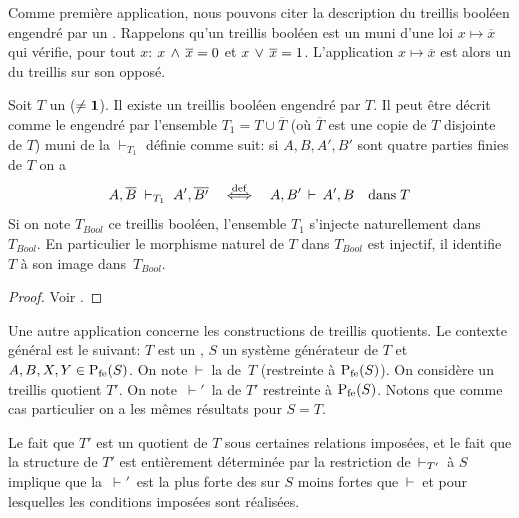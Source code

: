 Comme première application, nous pouvons citer la description du
treillis booléen engendré par un \trdi.
Rappelons qu'un treillis booléen
est un \trdi muni d'une loi $x\mapsto \overline{x}$ qui vérifie, pour 
tout
$x$: $x\,\wedge\, \overline{x}=0$ et $x\,\vee\, \overline{x}=1$.
L'application  $x\mapsto \overline{x}$  est alors
un \iso du treillis sur son opposé.
\begin{proposition}
\label{propTrBoo}
Soit $T$ un \trdi ($\neq {\bf 1}$). Il existe un treillis booléen
engendré
par $T$. Il peut être décrit comme le \trdi engendré par
l'ensemble
$T_1=T\cup\overline{T}$ (où $\overline{T}$  est une copie de $T$ disjointe de
$T$)
 muni de la \entrel $\vdash_{T_1}$ définie comme
suit:
si $A,B,A',B'$  sont quatre parties finies de $T$  on a
$$
A,\overline{B}\;\vdash_{T_1}\; A',\overline{B'}\equidef A,B'\vda
A',B\quad
{\rm dans} \;  T
$$
Si on note $T_{Bool}$ ce treillis booléen, l'ensemble $T_1$ s'injecte naturellement dans $T_{Bool}$. En particulier le morphisme naturel
de $T$ dans $T_{Bool}$ est injectif, il identifie $T$ à son image 
dans~$T_{Bool}$.
\end{proposition}
\begin{proof}
Voir \cite{cc}.
\end{proof}

Une autre application concerne les constructions de treillis quotients.
Le contexte général est le suivant:
$T$ est un \trdi, $S$ un système générateur de $T$ et $A,B,X,Y\in{{\rm P}_{{\rm fe}}}(S)$. On note $\,\vdash\,$ la \entrel de~$T$ (restreinte à ${{\rm P}_{{\rm fe}}}(S)$). 
On considère un treillis quotient $T'$. On note $\,\vdash'\,$ la \entrel de $T'$ restreinte à ${{\rm P}_{{\rm fe}}}(S)$.
Notons que comme cas particulier on a les mêmes résultats pour $S=T$.

Le fait que $T'$ est un quotient de $T$ sous certaines relations imposées, et le fait que la structure de $T'$ est entièrement déterminée par la restriction de $\,\vdash_{T'}\,$ à $S$ implique que la \entrel  $\,\vdash'\,$ est la plus forte des \entrels sur $S$ moins fortes que $\,\vdash\,$ et pour lesquelles  les conditions imposées sont réalisées.


